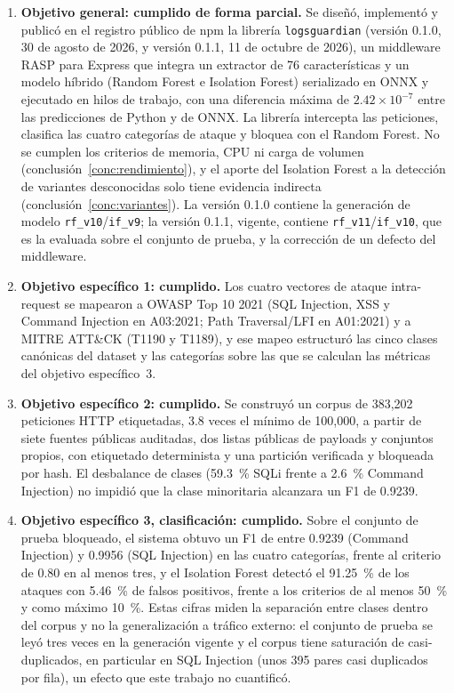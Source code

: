 \begin{enumerate}
    \item \textbf{Objetivo general: cumplido de forma parcial.}\label{conc:og} Se diseñó, implementó y publicó en
    el registro público de npm la librería \texttt{logsguardian} (versión 0.1.0, 30 de agosto de
    2026, y versión 0.1.1, 11 de octubre de 2026), un middleware RASP para Express que integra un
    extractor de 76 características y un modelo híbrido (Random Forest e Isolation Forest)
    serializado en ONNX y ejecutado en hilos de trabajo, con una diferencia máxima de
    $2.42\times10^{-7}$ entre las predicciones de Python y de ONNX. La librería intercepta las
    peticiones, clasifica las cuatro categorías de ataque y bloquea con el Random Forest. No se
    cumplen los criterios de memoria, CPU ni carga de volumen (conclusión~\ref{conc:rendimiento}), y
    el aporte del Isolation Forest a la detección de variantes desconocidas solo tiene evidencia
    indirecta (conclusión~\ref{conc:variantes}). La versión 0.1.0 contiene la generación de modelo
    \texttt{rf\_v10}/\texttt{if\_v9}; la versión 0.1.1, vigente, contiene \texttt{rf\_v11}/\texttt{if\_v10},
    que es la evaluada sobre el conjunto de prueba, y la corrección de un defecto del middleware.

    \item \textbf{Objetivo específico 1: cumplido.} Los cuatro vectores de ataque intra-request se
    mapearon a OWASP Top 10 2021 (SQL Injection, XSS y Command Injection en A03:2021; Path
    Traversal/LFI en A01:2021) y a MITRE ATT\&CK (T1190 y T1189), y ese mapeo estructuró las cinco
    clases canónicas del dataset y las categorías sobre las que se calculan las métricas del
    objetivo específico~3.

    \item \textbf{Objetivo específico 2: cumplido.} Se construyó un corpus de 383{,}202 peticiones
    HTTP etiquetadas, 3.8 veces el mínimo de 100{,}000, a partir de siete fuentes públicas
    auditadas, dos listas públicas de payloads y conjuntos propios, con etiquetado determinista y
    una partición verificada y bloqueada por hash. El desbalance de clases (59.3~\% SQLi frente a
    2.6~\% Command Injection) no impidió que la clase minoritaria alcanzara un F1 de 0.9239.

    \item \textbf{Objetivo específico 3, clasificación: cumplido.}\label{conc:clasificacion} Sobre el conjunto de prueba
    bloqueado, el sistema obtuvo un F1 de entre 0.9239 (Command Injection) y 0.9956 (SQL Injection)
    en las cuatro categorías, frente al criterio de 0.80 en al menos tres, y el Isolation Forest
    detectó el 91.25~\% de los ataques con 5.46~\% de falsos positivos, frente a los criterios de
    al menos 50~\% y como máximo 10~\%. Estas cifras miden la separación entre clases dentro del
    corpus y no la generalización a tráfico externo: el conjunto de prueba se leyó tres veces en la
    generación vigente y el corpus tiene saturación de casi-duplicados, en particular en SQL
    Injection (unos 395 pares casi duplicados por fila), un efecto que este trabajo no cuantificó.


\end{enumerate}
